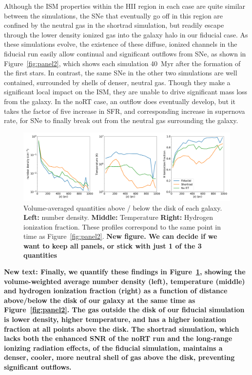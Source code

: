 \documentclass[twocolumn]{aastex62}
\begin{document}
Although the ISM properties within the HII region in each case are quite similar between the simulations, the SNe that eventually go off in this region are confined by the neutral gas in the shortrad simulation, but readily escape through the lower density ionized gas into the galaxy halo in our fiducial case. As these simulations evolve, the existence of these diffuse, ionized channels in the fiducial run easily allow continual and significant outflows from SNe, as shown in  Figure~\ref{fig:panel2}, which shows each simulation 40~Myr after the formation of the first stars. In contrast, the same SNe in the other two simulations are well contained, surrounded by shells of denser, neutral gas. Though they make a significant local impact on the ISM, they are unable to drive significant mass loss from the galaxy. In the noRT case, an outflow does eventually develop, but it takes the factor of five increase in SFR, and corresponding increase in supernova rate, for SNe to finally break out from the neutral gas surrounding the galaxy. 

\begin{figure}
\centering
\includegraphics[width=0.98\linewidth]{density_temperature_ionization_z_profile}
\caption{Volume-averaged quantities above / below the disk of each galaxy. {\bf Left:} number density. {\bf Middle:} Temperature {\bf Right:} Hydrogen ionization fraction. These profiles correspond to the same point in time as Figure~\ref{fig:panel2}. \textbf{New figure. We can decide if we want to keep all panels, or stick with just 1 of the 3 quantities}}
\label{fig:vertical profiles}
\end{figure}

\textbf{New text: Finally, we quantify these findings in Figure~\ref{fig:vertical profiles}, showing the volume-weighted average number density (left), temperature (middle) and hydrogen ionization fraction (right) as a function of distance above/below the disk of our galaxy at the same time as Figure~\ref{fig:panel2}. The gas outside the disk of our fiducial simulation is lower density, higher temperature, and has a higher ionization fraction at all points above the disk. The shortrad simulation, which lacks both the enhanced SNR of the noRT run and the long-range ionizing radiation effects, of the fiducial simulation, maintains a denser, cooler, more neutral shell of gas above the disk, preventing significant outflows.}
\end{document}
